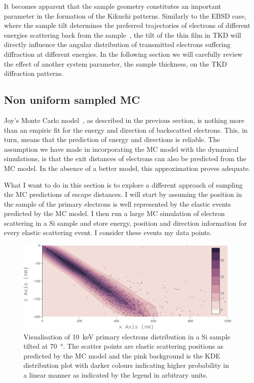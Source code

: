 It becomes apparent that the sample geometry constitutes an important parameter in the formation of the Kikuchi patterns. Similarly to the EBSD case, where the sample tilt determines the preferred trajectories of electrons of different energies scattering back from the sample~\cite{degraef2013e}, the tilt of the thin film in TKD will directly influence the angular distribution of transmitted electrons suffering diffraction at different energies. In the following section we will carefully review the effect of another system parameter, the sample thickness, on the TKD diffraction patterns. 



\subsection{Non uniform sampled MC}


Joy's Monte Carlo model~\cite{joy1995a}, as described in the previous section, is nothing more than an empiric fit for the energy and direction of backscatted electrons. This, in turn, means that the prediction of energy and directions is reliable. The assumption we have made in incorporating the MC model with the dynamical simulations, is that the exit distances of electrons can also be predicted from the MC model. In the absence of a better model, this approximation proves adequate. 

What I want to do in this section is to explore a different approach of sampling the MC predictions of escape distances. I will start by assuming the position in the sample of the primary electrons is  well represented by the elastic events predicted by the MC model. I then run a large MC simulation of electron scattering in a Si sample and store energy, position and direction information for every elastic scattering event. I consider these events my data points.

\begin{figure}[ht]
\centering
\includegraphics[width=6.in]{Figures/elasticscatter.png}
\caption[Elastic scatter events distribution.]{Visualisation of \SI{10}{\kilo \electronvolt} primary electrons distribution in a Si sample tilted at \SI{70}{\degree}. The scatter points are elastic scattering positions as predicted by the MC model and the pink background is the KDE distribution plot with darker colours indicating higher probability in a linear manner as indicated by the legend in arbitrary units. }
\label{fig:elasticscatter}
\end{figure}

